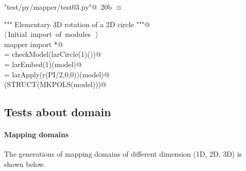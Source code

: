 \documentclass[11pt,oneside]{article}	%
\begin{document}
\begin{flushleft} \small \label{scrap38}
\protect{}\verb@"test/py/mapper/test03.py"@\nobreak\ {\footnotesize 20b }$\equiv$
\vspace{-1ex}
\begin{list}{}{} \item
\mbox{}\verb@""" Elementary 3D rotation of a 2D circle """@\\
\mbox{}\verb@@\hbox{$\langle\,$Initial import of modules\nobreak\ {\footnotesize {}}$\,\rangle$}\verb@@\\
\mbox{}\verb@from mapper import *@\\
\mbox{}\verb@model = checkModel(larCircle(1)())@\\
\mbox{}\verb@model = larEmbed(1)(model)@\\
\mbox{}\verb@model = larApply(r(PI/2,0,0))(model)@\\
\mbox{}\verb@VIEW(STRUCT(MKPOLS(model)))@\\
\mbox{}\verb@@{\NWsep}
\end{list}
\vspace{-2ex}
\end{flushleft}




\subsection{Tests about domain}

\paragraph{Mapping domains}
The generations of mapping domains of different dimension (1D, 2D, 3D) is shown below.
	
\end{document}
